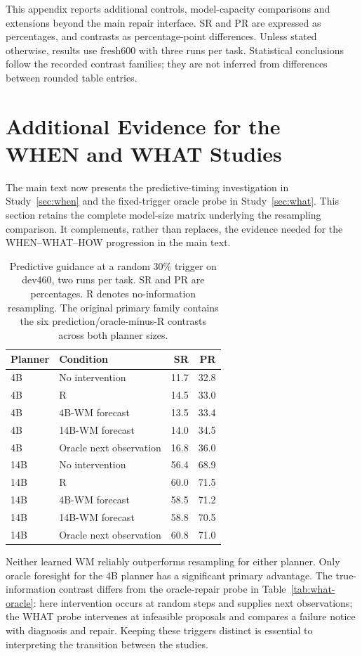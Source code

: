 This appendix reports additional controls, model-capacity comparisons and extensions beyond the main repair interface. SR and PR are expressed as percentages, and contrasts as percentage-point differences. Unless stated otherwise, results use fresh600 with three runs per task. Statistical conclusions follow the recorded contrast families; they are not inferred from differences between rounded table entries.

\section{Additional Evidence for the WHEN and WHAT Studies}
The main text now presents the predictive-timing investigation in Study~\ref{sec:when} and the fixed-trigger oracle probe in Study~\ref{sec:what}. This section retains the complete model-size matrix underlying the resampling comparison. It complements, rather than replaces, the evidence needed for the WHEN--WHAT--HOW progression in the main text.

\begin{table}[tbp]
\caption{Predictive guidance at a random 30\% trigger on dev460, two runs per task. SR and PR are percentages. R denotes no-information resampling. The original primary family contains the six prediction/oracle-minus-R contrasts across both planner sizes.}
\label{tab:prediction-matrix}\centering
\begin{tabular}{llrr}\toprule
Planner & Condition & SR & PR\\\midrule
4B & No intervention & 11.7 & 32.8\\
4B & R & 14.5 & 33.0\\
4B & 4B-WM forecast & 13.5 & 33.4\\
4B & 14B-WM forecast & 14.0 & 34.5\\
4B & Oracle next observation & 16.8 & 36.0\\\midrule
14B & No intervention & 56.4 & 68.9\\
14B & R & 60.0 & 71.5\\
14B & 4B-WM forecast & 58.5 & 71.2\\
14B & 14B-WM forecast & 58.8 & 70.5\\
14B & Oracle next observation & 60.8 & 71.0\\\bottomrule
\end{tabular}
\end{table}

Neither learned WM reliably outperforms resampling for either planner. Only oracle foresight for the 4B planner has a significant primary advantage. The true-information contrast differs from the oracle-repair probe in Table~\ref{tab:what-oracle}: here intervention occurs at random steps and supplies next observations; the WHAT probe intervenes at infeasible proposals and compares a failure notice with diagnosis and repair. Keeping these triggers distinct is essential to interpreting the transition between the studies.

